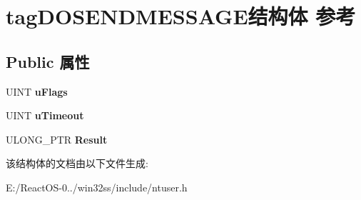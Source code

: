 \hypertarget{structtag_d_o_s_e_n_d_m_e_s_s_a_g_e}{}\section{tag\+D\+O\+S\+E\+N\+D\+M\+E\+S\+S\+A\+G\+E结构体 参考}
\label{structtag_d_o_s_e_n_d_m_e_s_s_a_g_e}
\subsection*{Public 属性}
\begin{DoxyCompactItemize}
\item 
\mbox{\label{structtag_d_o_s_e_n_d_m_e_s_s_a_g_e_a82fc03cb2383dd9b65a79870c5100bc3}} 
U\+I\+NT {\bfseries u\+Flags}
\item 
\mbox{\label{structtag_d_o_s_e_n_d_m_e_s_s_a_g_e_ab07f3d3374428791fba50cc32f40589a}} 
U\+I\+NT {\bfseries u\+Timeout}
\item 
\mbox{\label{structtag_d_o_s_e_n_d_m_e_s_s_a_g_e_ae57e3ea28a6a12a77434fca84f0c3020}} 
U\+L\+O\+N\+G\+\_\+\+P\+TR {\bfseries Result}
\end{DoxyCompactItemize}


该结构体的文档由以下文件生成\+:\begin{DoxyCompactItemize}
\item 
E\+:/\+React\+O\+S-\/0../win32ss/include/ntuser.\+h\end{DoxyCompactItemize}
